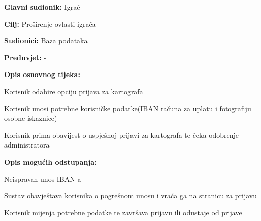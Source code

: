 					\noindent {}
					\begin{packed_item}
						
						\item \textbf{Glavni sudionik: }Igrač
						\item  \textbf{Cilj:} Proširenje ovlasti igrača
						\item  \textbf{Sudionici:} Baza podataka
						\item  \textbf{Preduvjet:} -
						\item  \textbf{Opis osnovnog tijeka:}
						
						\item[] \begin{packed_enum}
							
							\item Korisnik odabire opciju prijava za kartografa
							\item Korisnik unosi potrebne korisničke podatke(IBAN računa za uplatu i fotografiju osobne iskaznice)
							\item Korisnik prima obavijest o uspješnoj prijavi za kartografa te čeka odobrenje administratora
						\end{packed_enum}
						
						\item  \textbf{Opis mogućih odstupanja:}
						
						\item[] \begin{packed_item}
							
							\item Neispravan unos IBAN-a
							\item[] \begin{packed_enum}
								
								\item Sustav obavještava korisnika o pogrešnom unosu i vraća ga na stranicu za prijavu
								\item Korisnik mijenja potrebne podatke te završava prijavu ili odustaje od prijave
								
							\end{packed_enum}
							
						\end{packed_item}
					\end{packed_item}
				
					\newpage
					
